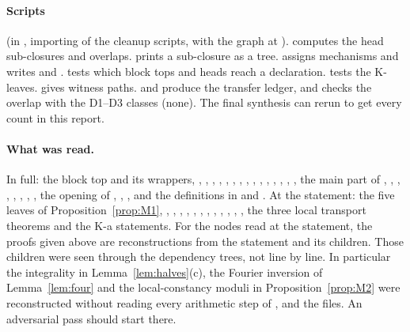 \documentclass[11pt]{article}
\theoremstyle{remark}
\begin{document}
\paragraph{Scripts} (in , importing  of the cleanup scripts, with the graph at ).  computes the head sub-closures and overlaps.  prints a sub-closure as a tree.  assigns mechanisms and writes  and .  tests which block tops and heads reach a declaration.  tests the K-leaves.  gives witness paths.  and  produce the transfer ledger, and  checks the overlap with the D1--D3 classes (none). The final synthesis can rerun  to get every count in this report.

\paragraph{What was read.} In full: the block top and its wrappers, , , , , , , , , , , , , , , , the main part of , , , , , , , , the opening of , , , and the definitions in  and . At the statement: the five leaves of Proposition~\ref{prop:M1}, , , , , , , , , , , , , the three local transport theorems and the K-a statements. For the nodes read at the statement, the proofs given above are reconstructions from the statement and its children. Those children were seen through the dependency trees, not line by line. In particular the integrality in Lemma~\ref{lem:halves}(c), the Fourier inversion of Lemma~\ref{lem:four} and the local-constancy moduli in Proposition~\ref{prop:M2} were reconstructed without reading every arithmetic step of ,  and the  files. An adversarial pass should start there.
\end{document}
